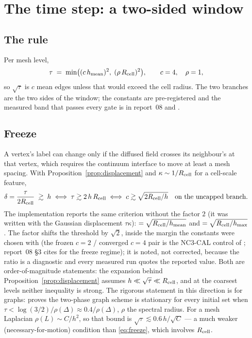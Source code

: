\documentclass[11pt,a4paper]{article}
\begin{document}
\section{The time step: a two-sided window}
\label{sec:tau}

\subsection{The rule}

Per mesh level,
\begin{equation}
  \tau \;=\; \min\bigl( (c\, h_{\mathrm{mean}})^2,\; (\rho\, R_{\mathrm{cell}})^2 \bigr),
  \qquad c = 4, \quad \rho = 1,
  \label{eq:tau-rule}
\end{equation}
so $\sqrt\tau$ is $c$ mean edges unless that would exceed the cell radius. The
two branches are the two sides of the window; the constants are pre-registered
and the measured band that passes every gate is in report~08 and
.

\subsection{Freeze}
\label{sec:freeze}

A vertex's label can change only if the diffused field crosses its neighbour's
at that vertex, which requires the continuum interface to move at least a mesh
spacing. With Proposition~\ref{prop:displacement} and $\kappa \sim 1/R_{\mathrm{cell}}$ for a
cell-scale feature,
\begin{equation}
  \delta = \frac{\tau}{2R_{\mathrm{cell}}} \;\gtrsim\; h
  \;\Longleftrightarrow\;
  \tau \gtrsim 2\, h\, R_{\mathrm{cell}}
  \;\Longleftrightarrow\;
  c \gtrsim \sqrt{2R_{\mathrm{cell}}/h} \quad\text{on the uncapped branch.}
  \label{eq:freeze}
\end{equation}
The implementation reports the same criterion without the factor $2$ (it was
written with the Gaussian displacement $\tau\kappa$):
 $= \sqrt{R_{\mathrm{cell}}/h_{\mathrm{mean}}}$ and
 $= \sqrt{R_{\mathrm{cell}}/h_{\mathrm{max}}}$. The factor shifts the threshold
by $\sqrt2$, inside the margin the constants were chosen with (the frozen
$c = 2$ / converged $c = 4$ pair is the NC3-CAL control of
; report~08 \S3 cites
\cite{vangennip2014mean} for the freeze regime); it is noted, not corrected, because the ratio is a
diagnostic and every measured run quotes the reported value. Both are
order-of-magnitude statements: the expansion behind
Proposition~\ref{prop:displacement} assumes $h \ll \sqrt\tau \ll R_{\mathrm{cell}}$, and at
the coarsest levels neither inequality is strong. The rigorous statement in this
direction is for graphs: \cite[Theorem~4.2]{vangennip2014mean} proves the
two-phase graph scheme is stationary for every initial set when
$\tau < \log(3/2)/\rho(\Delta) \approx 0.4/\rho(\Delta)$, $\rho$ the spectral
radius. For a mesh Laplacian $\rho(L) \sim C/h^2$, so that bound is
$\sqrt\tau \lesssim 0.6\,h/\sqrt C$ --- a much weaker (necessary-for-motion)
condition than \eqref{eq:freeze}, which involves $R_{\mathrm{cell}}$.
\end{document}
